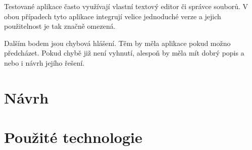     Testované aplikace často využívají vlastní textový editor či správce souborů. V obou případech tyto aplikace integrují velice jednoduché verze a jejich použitelnost je tak značně omezená.

    Dalším bodem jsou chybová hlášení. Těm by měla aplikace pokud možno předcházet. Pokud chybě již není vyhnutí, alespoň by měla mít dobrý popis a nebo i návrh jejího řešení.

\chapter{Návrh}
\chapter{Použité technologie}